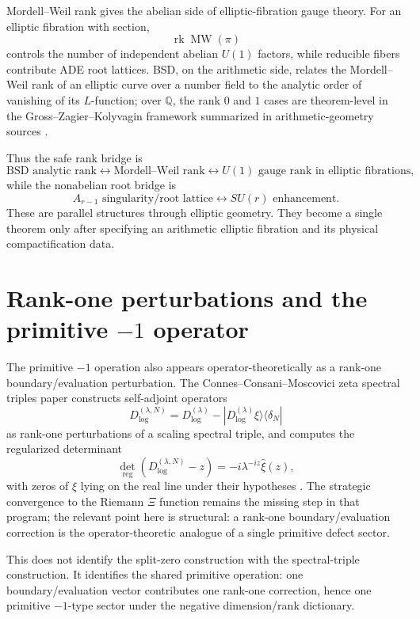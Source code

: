 \documentclass[11pt]{article}
\theoremstyle{remark}
\DeclareMathOperator{\rk}{rk}
\DeclareMathOperator{\MW}{MW}
\newcommand{\QQ}{\mathbb Q}
\begin{document}
Mordell--Weil rank gives the abelian side of elliptic-fibration gauge theory.  For an elliptic fibration with section,
\[
        \rk \MW(\pi)
\]
controls the number of independent abelian $U(1)$ factors, while reducible fibers contribute ADE root lattices.  BSD, on the arithmetic side, relates the Mordell--Weil rank of an elliptic curve over a number field to the analytic order of vanishing of its $L$-function; over $\QQ$, the rank $0$ and $1$ cases are theorem-level in the Gross--Zagier--Kolyvagin framework summarized in arithmetic-geometry sources \cite{ArithmeticGeometry}.

Thus the safe rank bridge is
\[
        \text{BSD analytic rank}
        \leftrightarrow
        \text{Mordell--Weil rank}
        \leftrightarrow
        U(1)\text{ gauge rank in elliptic fibrations},
\]
while the nonabelian root bridge is
\[
        A_{r-1}\text{ singularity/root lattice}
        \leftrightarrow
        SU(r)\text{ enhancement}.
\]
These are parallel structures through elliptic geometry.  They become a single theorem only after specifying an arithmetic elliptic fibration and its physical compactification data.

\section{Rank-one perturbations and the primitive $-1$ operator}

The primitive $-1$ operation also appears operator-theoretically as a rank-one boundary/evaluation perturbation.  The Connes--Consani--Moscovici zeta spectral triples paper constructs self-adjoint operators
\[
        D_{\log}^{(\lambda,N)}
        =D_{\log}^{(\lambda)}-|D_{\log}^{(\lambda)}\xi\rangle\langle\delta_N|
\]
as rank-one perturbations of a scaling spectral triple, and computes the regularized determinant
\[
        \det_{\mathrm{reg}}(D_{\log}^{(\lambda,N)}-z)
        =-i\lambda^{-iz}\widehat\xi(z),
\]
with zeros of $\widehat\xi$ lying on the real line under their hypotheses \cite{CCMSZ}.  The strategic convergence to the Riemann $\Xi$ function remains the missing step in that program; the relevant point here is structural: a rank-one boundary/evaluation correction is the operator-theoretic analogue of a single primitive defect sector.

This does not identify the split-zero construction with the spectral-triple construction.  It identifies the shared primitive operation: one boundary/evaluation vector contributes one rank-one correction, hence one primitive $-1$-type sector under the negative dimension/rank dictionary.
\end{document}
